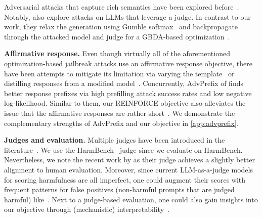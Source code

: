 Adversarial attacks that capture rich semantics have been explored before~\citep{qiu_SemanticAdv_2020, geisler_generalization_2022, wang_semantic_2023, kollovieh_assessing_2024}. Notably, \citet{wichers_gradient-based_2024} also explore attacks on LLMs that leverage a judge. In contrast to our work, they relax the generation using Gumble softmax~\citep{jang_categorical_2016} and backpropagate through the attacked model and judge for a GBDA-based optimization~\citep{guo_gradient-based_2021}. 

\textbf{Affirmative response.} Even though virtually all of the aforementioned optimization-based jailbreak attacks use an affirmative response objective, there have been attempts to mitigate its limitation via varying the template~\citep{jia_improved_2024} or distilling responses from a modified model~\citep{thompson_flrt_2024}. Concurrently, AdvPrefix 
 of \citet{zhu_advprefix_2024} finds better response prefixes via high prefilling attack success rates and low negative log-likelihood. Similar to them, our REINFORCE objective also alleviates the issue that the affirmative responses are rather short~\citep{qi_safety_2025}. We demonstrate the complementary strengths of AdvPrefix and our objective in \autoref{app:advprefix}.

\textbf{Judges and evaluation.} Multiple judges have been introduced in the literature~\citep{shen_anything_2024, chao_jailbreaking_2023, bhatt_purple_2023}. We use the HarmBench~\citep{mazeika_harmbench_2024} judge since we evaluate on HarmBench. Nevertheless, we note the recent work by \citet{souly_strongreject_2024} as their judge achieves a slightly better alignment to human evaluation. Moreover, since current LLM-as-a-judge models for scoring harmfulness are all imperfect, one could augment their scores with frequent patterns for false positives (non-harmful prompts that are judged harmful) like~\citet{hughes_best--n_2024}. Next to a judge-based evaluation, one could also gain insights into our objective through (mechanistic) interpretability~\citep{arditi_refusal_2024, wollschlager_geometry_2025}.
